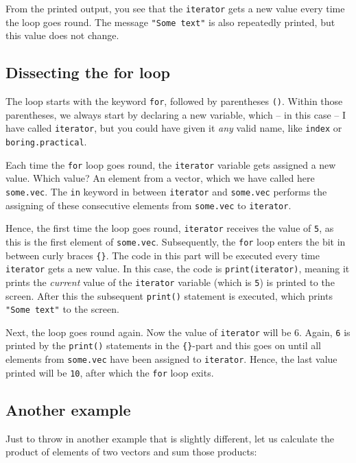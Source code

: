 \documentclass[
]{book}
\begin{document}
From the printed output, you see that the \texttt{iterator} gets a new value every time the loop goes round. The message \texttt{"Some\ text"} is also repeatedly printed, but this value does not change.

\subsection{Dissecting the for loop}\label{dissecting-the-for-loop}

The loop starts with the keyword \texttt{for}, followed by parentheses \texttt{()}. Within those parentheses, we always start by declaring a new variable, which -- in this case -- I have called \texttt{iterator}, but you could have given it \emph{any} valid name, like \texttt{index} or \texttt{boring.practical}.

Each time the \texttt{for} loop goes round, the \texttt{iterator} variable gets assigned a new value. Which value? An element from a vector, which we have called here \texttt{some.vec}. The \texttt{in} keyword in between \texttt{iterator} and \texttt{some.vec} performs the assigning of these consecutive elements from \texttt{some.vec} to \texttt{iterator}.

Hence, the first time the loop goes round, \texttt{iterator} receives the value of \texttt{5}, as this is the first element of \texttt{some.vec}. Subsequently, the \texttt{for} loop enters the bit in between curly braces \texttt{\{\}}. The code in this part will be executed every time \texttt{iterator} gets a new value. In this case, the code is \texttt{print(iterator)}, meaning it prints the \emph{current} value of the \texttt{iterator} variable (which is \texttt{5}) is printed to the screen. After this the subsequent \texttt{print()} statement is executed, which prints \texttt{"Some\ text"} to the screen.

Next, the loop goes round again. Now the value of \texttt{iterator} will be 6. Again, \texttt{6} is printed by the \texttt{print()} statements in the \texttt{\{\}}-part and this goes on until all elements from \texttt{some.vec} have been assigned to \texttt{iterator}. Hence, the last value printed will be \texttt{10}, after which the \texttt{for} loop exits.

\subsection{Another example}\label{another-example}

Just to throw in another example that is slightly different, let us calculate the product of elements of two vectors and sum those products:
\end{document}
